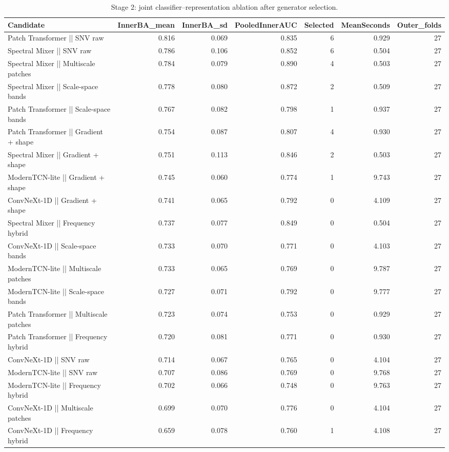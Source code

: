 \begin{table}[t]
\centering
\caption{Stage 2: joint classifier--representation ablation after generator selection.}
\footnotesize
\begin{tabular}{lrrrrrr}
\toprule
Candidate & InnerBA\_mean & InnerBA\_sd & PooledInnerAUC & Selected & MeanSeconds & Outer\_folds \\
\midrule
Patch Transformer || SNV raw & 0.816 & 0.069 & 0.835 & 6 & 0.929 & 27 \\
Spectral Mixer || SNV raw & 0.786 & 0.106 & 0.852 & 6 & 0.504 & 27 \\
Spectral Mixer || Multiscale patches & 0.784 & 0.079 & 0.890 & 4 & 0.503 & 27 \\
Spectral Mixer || Scale-space bands & 0.778 & 0.080 & 0.872 & 2 & 0.509 & 27 \\
Patch Transformer || Scale-space bands & 0.767 & 0.082 & 0.798 & 1 & 0.937 & 27 \\
Patch Transformer || Gradient + shape & 0.754 & 0.087 & 0.807 & 4 & 0.930 & 27 \\
Spectral Mixer || Gradient + shape & 0.751 & 0.113 & 0.846 & 2 & 0.503 & 27 \\
ModernTCN-lite || Gradient + shape & 0.745 & 0.060 & 0.774 & 1 & 9.743 & 27 \\
ConvNeXt-1D || Gradient + shape & 0.741 & 0.065 & 0.792 & 0 & 4.109 & 27 \\
Spectral Mixer || Frequency hybrid & 0.737 & 0.077 & 0.849 & 0 & 0.504 & 27 \\
ConvNeXt-1D || Scale-space bands & 0.733 & 0.070 & 0.771 & 0 & 4.103 & 27 \\
ModernTCN-lite || Multiscale patches & 0.733 & 0.065 & 0.769 & 0 & 9.787 & 27 \\
ModernTCN-lite || Scale-space bands & 0.727 & 0.071 & 0.792 & 0 & 9.777 & 27 \\
Patch Transformer || Multiscale patches & 0.723 & 0.074 & 0.753 & 0 & 0.929 & 27 \\
Patch Transformer || Frequency hybrid & 0.720 & 0.081 & 0.771 & 0 & 0.930 & 27 \\
ConvNeXt-1D || SNV raw & 0.714 & 0.067 & 0.765 & 0 & 4.104 & 27 \\
ModernTCN-lite || SNV raw & 0.707 & 0.086 & 0.769 & 0 & 9.768 & 27 \\
ModernTCN-lite || Frequency hybrid & 0.702 & 0.066 & 0.748 & 0 & 9.763 & 27 \\
ConvNeXt-1D || Multiscale patches & 0.699 & 0.070 & 0.776 & 0 & 4.104 & 27 \\
ConvNeXt-1D || Frequency hybrid & 0.659 & 0.078 & 0.760 & 1 & 4.108 & 27 \\
\bottomrule
\end{tabular}
\end{table}

